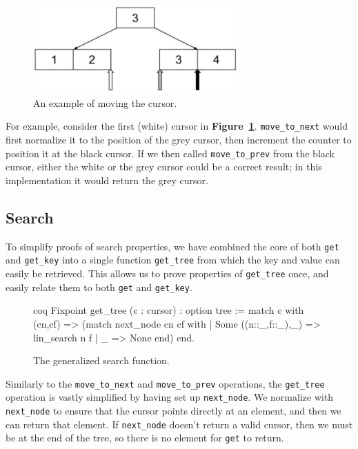 \documentclass[12pt]{article}
\begin{document}
\begin{figure}
    \centering
    \includegraphics[width=0.7\textwidth]{movecursor.jpg}
    \caption{An example of moving the cursor.}
    \label{fig:movecursor}
\end{figure}

For example, consider the first (white) cursor in \textbf{Figure~\ref{fig:movecursor}}. \texttt{move\_to\_next} would first normalize it to the position of the grey cursor, then increment the counter to position it at the black cursor. If we then called \texttt{move\_to\_prev} from the black cursor, either the white or the grey cursor could be a correct result; in this implementation it would return the grey cursor.

\subsection{Search}

To simplify proofs of search properties, we have combined the core of both \texttt{get} and \texttt{get\_key} into a single function \texttt{get\_tree} from which the key and value can easily be retrieved. This allows us to prove properties of \texttt{get\_tree} once, and easily relate them to both \texttt{get} and \texttt{get\_key}.

\begin{singlespace}
\begin{figure}[ht]
\centering
\begin{cminted}{coq}
Fixpoint get_tree (c : cursor) : option tree :=
  match c with (cn,cf) =>
  (match next_node cn cf with
   | Some ((n::_,f::_),_) => lin_search n f
   | _ => None
   end)
  end.
\end{cminted}
\caption{The generalized search function.}
\end{figure}
\end{singlespace}

Similarly to the \texttt{move\_to\_next} and \texttt{move\_to\_prev} operations, the \texttt{get\_tree} operation is vastly simplified by having set up \texttt{next\_node}. We normalize with \texttt{next\_node} to ensure that the cursor points directly at an element, and then we can return that element. If \texttt{next\_node} doesn’t return a valid cursor, then we must be at the end of the tree, so there is no element for \texttt{get} to return.
\end{document}
